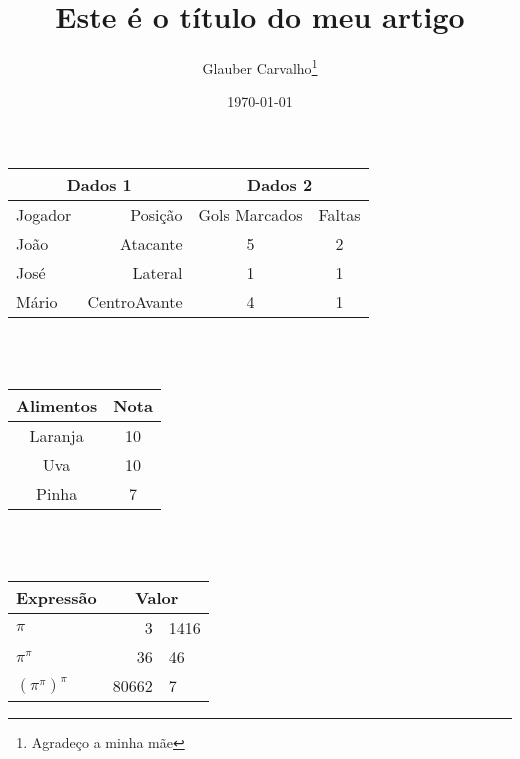 \documentclass[12pt, a4paperm, openany]{article}	%
\title{Este é o título do meu artigo}	%
\author{Glauber Carvalho\thanks{Agradeço a minha mãe}}	%
\date{\today}	%
\begin{document}
	\begin{tabular}{|l||r|c|c|}	%
		\hline
		\multicolumn{2}{|c|}{Dados 1}	&	\multicolumn{2}{|c|}{Dados 2}	\\
		\hline
		Jogador	&	Posição			&	Gols Marcados	&	Faltas	\\
		\hline
		\hline
		João	&	Atacante		&	5				&	2		\\
		\hline
		José	&	Lateral			&	1				&	1		\\
		\hline
		Mário	&	CentroAvante	&	4				&	1		\\
		\hline
	\end{tabular}
	\\ 
	\\

	\begin{tabular}{|c|c|}
		\hline
		Alimentos & Nota \\ \hline
		 Laranja  &  10  \\ \hline
		   Uva    &  10  \\ \hline
		  Pinha   &  7   \\ \hline
	\end{tabular}
	\\
	\\
	
	\begin{tabular}{lr@{.}l}	%
		Expressão & \multicolumn{2}{c}{Valor} \\ \hline
		$\pi$ & 3 & 1416 \\
		$\pi^\pi$ & 36 & 46 \\
		$(\pi^\pi)^\pi$ & 80662 & 7 \\
		\hline
	\end{tabular}

		
\end{document}
